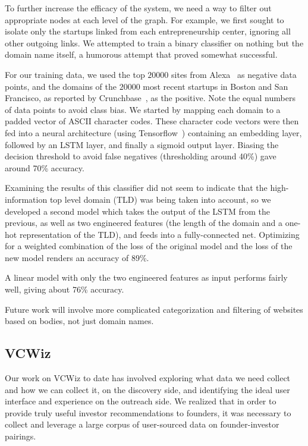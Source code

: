 To further increase the efficacy of the system, we need a way to filter out appropriate nodes at each level of the graph. For example, we first sought to isolate only the startups linked from each entrepreneurship center, ignoring all other outgoing links. We attempted to train a binary classifier on nothing but the domain name itself, a humorous attempt that proved somewhat successful.

For our training data, we used the top $20000$ sites from Alexa~\cite{alexa} as negative data points, and the domains of the $20000$ most recent startups in Boston and San Francisco, as reported by Crunchbase~\cite{crunchbase}, as the positive. Note the equal numbers of data points to avoid class bias. We started by mapping each domain to a padded vector of ASCII character codes. These character code vectors were then fed into a neural architecture (using Tensorflow~\cite{tensorflow}) containing an embedding layer, followed by an LSTM layer, and finally a sigmoid output layer. Biasing the decision threshold to avoid false negatives (thresholding around 40\%) gave around 70\% accuracy.


Examining the results of this classifier did not seem to indicate that the high-information top level domain (TLD) was being taken into account, so we developed a second model which takes the output of the LSTM from the previous, as well as two engineered features (the length of the domain and a one-hot representation of the TLD), and feeds into a fully-connected net. Optimizing for a weighted combination of the loss of the original model and the loss of the new model renders an accuracy of 89\%.


A linear model with only the two engineered features as input performs fairly well, giving about 76\% accuracy.


Future work will involve more complicated categorization and filtering of websites based on bodies, not just domain names.

\subsection{VCWiz}

Our work on VCWiz to date has involved exploring what data we need collect and how we can collect it, on the discovery side, and identifying the ideal user interface and experience on the outreach side. We realized that in order to provide truly useful investor recommendations to founders, it was necessary to collect and leverage a large corpus of user-sourced data on founder-investor pairings.

